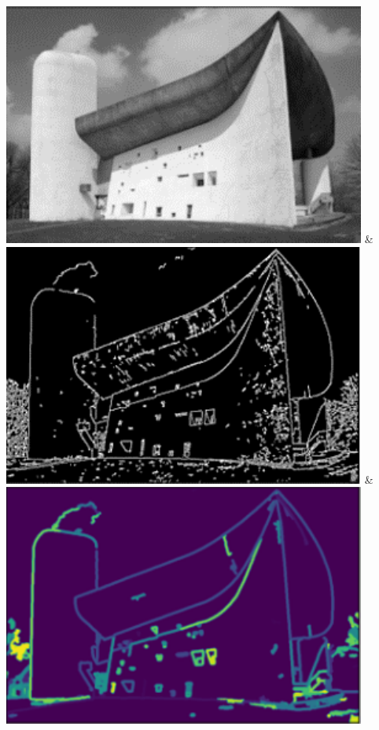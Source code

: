 \documentclass[final,5p,times]{elsarticle}
\begin{document}
\begin{table}[htb]
\begin{tabularx}
            {\includegraphics[width=1\linewidth]{Images/CICAHistory2}} &
          {\includegraphics[width=1\linewidth]{Images/CICAHistory3}} &
          {\includegraphics[width=1\linewidth]{Images/CICAHistory4}}\\
        \bottomrule
    \end{tabularx}
\end{table}
\end{document}

